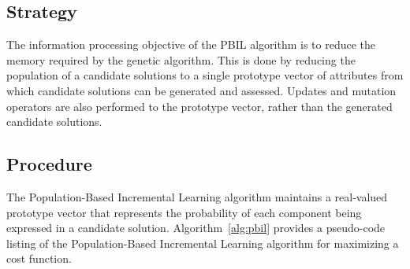 \subsection{Strategy}
The information processing objective of the PBIL algorithm is to reduce the memory required by the genetic algorithm.
This is done by reducing the population of a candidate solutions to a single prototype vector of attributes from which candidate solutions can be generated and assessed. Updates and mutation operators are also performed to the prototype vector, rather than the generated candidate solutions.

\subsection{Procedure}
The Population-Based Incremental Learning algorithm maintains a real-valued prototype vector that represents the probability of each component being expressed in a candidate solution. 
Algorithm~\ref{alg:pbil} provides a pseudo-code listing of the Population-Based Incremental Learning algorithm for maximizing a cost function.

